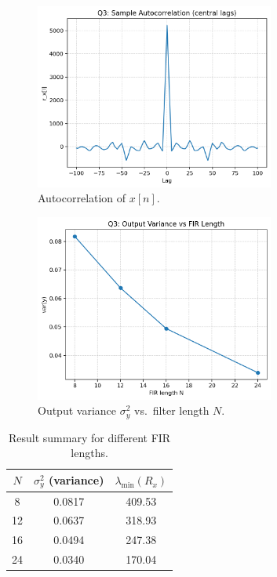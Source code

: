 \documentclass[12pt,a4paper]{article}
\begin{document}
\begin{figure}[H]
    \centering
    \includegraphics[width=0.7\textwidth]{outputs/q3/q3_autocorr.png}
    \caption{Autocorrelation of $x[n]$.}
    \label{fig:q3_autocorr}
\end{figure}

\begin{figure}[H]
    \centering
    \includegraphics[width=0.7\textwidth]{outputs/q3/q3_var_vs_N.png}
    \caption{Output variance $\sigma_y^2$ vs.\ filter length $N$.}
    \label{fig:q3_var_vs_N}
\end{figure}

\begin{table}[H]
\centering
\caption{Result summary for different FIR lengths.}
\label{tab:q3_results}
\begin{tabular}{@{}ccc@{}}
\toprule
$N$ & $\sigma_y^2$ (variance) & $\lambda_{\min}(R_x)$ \\
\midrule
8  & 0.0817 & 409.53 \\
12 & 0.0637 & 318.93 \\
16 & 0.0494 & 247.38 \\
24 & 0.0340 & 170.04 \\
\bottomrule
\end{tabular}
\end{table}
\end{document}
